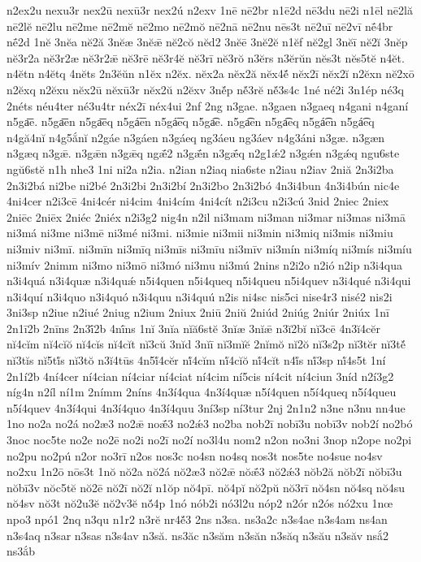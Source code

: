 {n2ex2u
nexu3r
nex2ū
nexū3r
nex2ú
n2exv
1nē
nē2br
n1ē2d
nē3du
nē2i
n1ēl
nē2lă
nē2lĕ
nē2lu
nē2me
nē2mĕ
nē2mo
nē2mŏ
nē2nā
nē2nu
nēs3t
nē2uī
nē2vī
nḗ4br
nḗ2d
1nĕ
3nĕa
nĕ2ă
3nĕæ
3nĕǣ
nĕ2cŏ
nĕd2
3nĕē
3nĕ2ĕ
n1ĕf
nĕ2gl
3nĕī
nĕ2ĭ
3nĕp
nĕ3r2a
nĕ3r2æ
nĕ3r2ǣ
nĕ3rē
nĕ3r4ĕ
nĕ3rī
nĕ3rŏ
n3ĕrs
n3ĕrŭn
nĕs3t
nĕs5tĕ
n4ĕt.
n4ĕtn
n4ĕtq
4nĕts
2n3ĕŭn
n1ĕx
n2ĕx.
nĕx2a
nĕx2ă
nĕx4ĕ́
nĕx2ī
nĕx2ĭ
n2ĕxn
nĕ2xō
n2ĕxq
n2ĕxu
nĕx2ū
nĕxū3r
nĕx2ŭ
n2ĕxv
3nĕ́p
nĕ́3rĕ
nĕ́3s4c
1né
né2i
3n1ép
né3q
2néts
néu4ter
né3u4tr
néx2ī
néx4ui
2nf
2ng
n3gae.
n3gaen
n3gaeq
n4gani
n4ganí
n5ga͞e.
n5ga͞en
n5ga͞eq
n5gá͞en
n5gá͞eq
n5ga͡e.
n5ga͡en
n5ga͡eq
n5gá͡en
n5gá͡eq
n4gă4nĭ
n4g5ắnĭ
n2gáe
n3gáen
n3gáeq
ng3áeu
ng3áev
n4g3áni
n3gæ.
n3gæn
n3gæq
n3gǣ.
n3gǣn
n3gǣq
ngǣ́2
n3gǣ́n
n3gǣ́q
n2g1ǽ2
n3gǽn
n3gǽq
ngu6ste
ngŭ6stĕ
n1h
nhe3
1ni
ni2a
n2ia.
n2ian
n2iaq
nia6ste
n2iau
n2iav
2niă
2n3i2ba
2n3i2bá
ni2be
ni2bé
2n3i2bi
2n3i2bí
2n3i2bo
2n3i2bó
4n3i4bun
4n3i4bún
nic4e
4ni4cer
n2i3cē
4ni4cér
ni4cim
4ni4cím
4ni4cít
n2i3cu
n2i3cú
3nid
2niec
2niex
2niēc
2niēx
2niéc
2niéx
n2i3g2
nig4n
n2il
ni3mam
ni3man
ni3mar
ni3mas
ni3mā
ni3má
ni3me
ni3mē
ni3mé
ni3mi.
ni3mie
ni3mii
ni3min
ni3miq
ni3mis
ni3miu
ni3miv
ni3mī.
ni3mīn
ni3mīq
ni3mīs
ni3mīu
ni3mīv
ni3mín
ni3míq
ni3mís
ni3míu
ni3mív
2nimm
ni3mo
ni3mō
ni3mó
ni3mu
ni3mú
2nins
n2i2o
n2ió
n2ip
n3i4qua
n3i4quá
n3i4quæ
n3i4quǽ
n5i4quen
n5i4queq
n5i4queu
n5i4quev
n3i4qué
n3i4qui
n3i4quí
n3i4quo
n3i4quó
n3i4quu
n3i4quú
n2is
ni4sc
nis5ci
nise4r3
nisé2
nis2i
3ni3sp
n2iue
n2iué
2niug
n2ium
2niux
2niū
2niŭ
2niúd
2niúg
2niúr
2niúx
1nī
2n1ī2b
2nīns
2n3ī́2b
4nī́ns
1nĭ
3nĭa
nĭă6stĕ
3nĭæ
3nĭǣ
n3ĭ2bĭ
nĭ3cē
4n3ĭ4cĕr
nĭ4cĭm
nĭ4cĭŏ
nĭ4cĭs
nĭ4cĭt
nĭ3cŭ
3nĭd
3nĭī
nĭ3mĭĕ
2nĭmŏ
nĭ2ŏ
nĭ3s2p
nĭ3tĕr
nĭ3tĕ́
nĭ3tĭs
nĭ5tĭ́s
nĭ3tŏ
n3ĭ4tūs
4n5ĭ́4cĕr
nĭ́4cĭm
nĭ́4cĭŏ
nĭ́4cĭt
n4ĭ́s
nĭ́3sp
nĭ́4s5t
1ní
2n1í2b
4ní4cer
ní4cian
ní4ciar
ní4ciat
ní4cim
ní5cis
ní4cit
ní4ciun
3níd
n2í3g2
níg4n
n2íl
ní1m
2nímm
2níns
4n3í4qua
4n3í4quæ
n5í4quen
n5í4queq
n5í4queu
n5í4quev
4n3í4qui
4n3í4quo
4n3í4quu
3ní3sp
ní3tur
2nj
2n1n2
n3ne
n3nu
nn4ue
1no
no2a
no2á
no2æ3
no2ǣ
noǣ́3
no2ǽ3
no2ba
nob2ī
nobī3u
nobī3v
nob2í
no2bó
3noc
noc5te
no2e
no2ē
no2i
no2ī
no2í
no3l4u
nom2
n2on
no3ni
3nop
n2ope
no2pi
no2pu
no2pú
n2or
no3rī
n2os
nos3c
no4sn
no4sq
nos3t
nos5te
no4sue
no4sv
no2xu
1n2ō
nōs3t
1nŏ
nŏ2a
nŏ2á
nŏ2æ3
nŏ2ǣ
nŏǣ́3
nŏ2ǽ3
nŏb2ă
nŏb2ī
nŏbī3u
nŏbī3v
nŏc5tĕ
nŏ2ē
nŏ2ī
nŏ2ĭ
n1ŏp
nŏ4pī.
nŏ4pĭ
nŏ2pŭ
nŏ3rī
nŏ4sn
nŏ4sq
nŏ4su
nŏ4sv
nŏ3t
nŏ2u3ĕ
nŏ2v3ĕ
nŏ́4p
1nó
nób2i
nó3l2u
nóp2
n2ór
n2ós
nó2xu
1nœ
npo3
npó1
2nq
n3qu
n1r2
n3rĕ
nr4ĕ́3
2ns
n3sa.
ns3a2c
n3s4ae
n3s4am
ns4an
n3s4aq
n3sar
n3sas
n3s4av
n3să.
ns3ăc
n3săm
n3săn
n3săq
n3său
n3săv
nsắ2
ns3ắb
}
